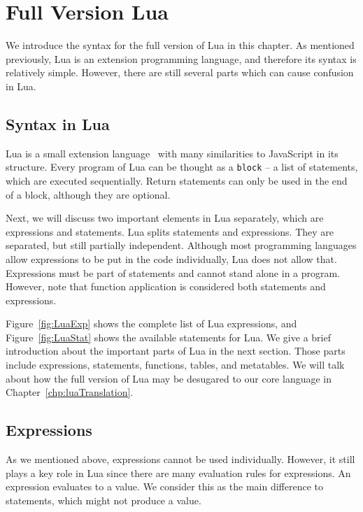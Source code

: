 \newcommand{\syntax}[2]{{\tt #1}{\tt ~::=}{\tt ~~#2}\\}
\newcommand{\syntaxcase}[1]{{\tt \quad\quad\quad\quad\quad\quad~}{\tt ~~#1}\\}
\newcommand{\mydefhead}[2]{\multicolumn{2}{l}{{#1}}&\mbox{\emph{#2}}\\}
\newcommand{\mydefcase}[2]{\qquad\qquad& #1 &\mbox{#2}\\}
\newcommand{\functiondef}[2]{\mbox{\tt function}~(\overline{#1_i})~#2~ {\tt end}}


\chapter{Full Version Lua}\label{FullLua}
We introduce the syntax for the full version of Lua in this chapter. As mentioned previously, Lua is an extension programming language, and therefore its syntax is relatively simple. However, there are still several parts which can cause confusion in Lua.

\section{Syntax in Lua}
Lua is a small extension language~\cite{PIL} with many similarities to JavaScript in its structure. Every program of Lua can be thought as a {\tt block} -- a list of statements, which are executed sequentially. Return statements can only be used in the end of a block, although they are optional.

Next, we will discuss two important elements in Lua separately, which are expressions and statements.
Lua splits statements and expressions.
They are separated, but still partially independent. Although most programming languages allow expressions to be put in the code individually, Lua does not allow that. Expressions must be part of statements and cannot stand alone in a program. However, note that function application is considered both statements and expressions.

Figure~\ref{fig:LuaExp} shows the complete list of Lua expressions, and Figure~\ref{fig:LuaStat} shows the available statements for Lua. We give a brief introduction about the important parts of Lua in the next section. Those parts include expressions, statements, functions, tables, and metatables. We will talk about how the full version of Lua may be desugared to our core language in Chapter~\ref{chp:luaTranslation}.

\section{Expressions}
As we mentioned above, expressions cannot be used individually. However, it still plays a key role in Lua since there are many evaluation rules for expressions. An expression evaluates to a value. We consider this as the main difference to statements, which might not produce a value.

